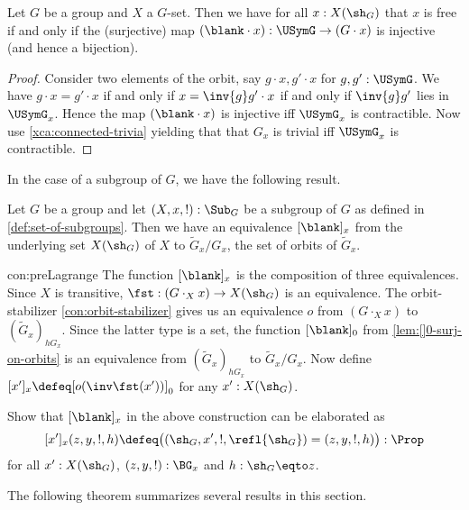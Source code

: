 \begin{lemma}\label{lem:free-pt-char}
  Let $G$ be a group and $X$ a $G$-set. Then we have for all $x:X(\sh_G)$
  that $x$ is free if and only if the (surjective) map
  $(\blank \cdot x) : \USymG \to (G\cdot x)$ is injective
  (and hence a bijection).
\end{lemma}
\begin{proof}
  Consider two elements of the orbit, say $g\cdot x,g'\cdot x$ for $g,g':\USymG$.
  We have $g\cdot x=g' \cdot x$ if and only if $x = \inv{g} g'\cdot x$
  if and only if $\inv{g} g'$ lies in $\USymG_x$.
  Hence the map $(\blank \cdot x)$ is injective iff $\USymG_x$ is contractible.
  Now use \cref{xca:connected-trivia} yielding that that 
  $G_x$ is trivial iff $\USymG_x$ is contractible.
\end{proof}

In the case of a subgroup of $G$, we have the following result.

\begin{construction}\label{con:preLagrange}
  Let $G$ be a group and let $(X,x,!):\Sub_G$ be a subgroup of $G$ as defined
  in \cref{def:set-of-subgroups}. Then we have an equivalence
  $[\blank]_x$ from the underlying set $X(\sh_G)$ of $X$ to 
  $\tilde G_x /G_x$, the set of orbits of $\tilde G_x$. 
\end{construction}
\begin{implementation}{con:preLagrange}
The function $[\blank]_x$ is the composition of three equivalences.
Since $X$ is transitive, $\fst: (G\cdot_X x)\to X(\sh_G)$ is an equivalence.
The orbit-stabilizer \cref{con:orbit-stabilizer} gives us an equivalence $o$
from $(G\cdot_X x)$ to $(\tilde G_x)_{hG_x}$. Since the latter type is a set,
the function $[\blank]_0$ from \cref{lem:[]0-surj-on-orbits} 
is an equivalence from $(\tilde G_x)_{hG_x}$ to $\tilde G_x /G_x$.
Now define $[x']_x \defeq [o(\inv\fst(x'))]_0$ for any $x':X(\sh_G)$.
\end{implementation}

\begin{xca}\label{xca:preLagrange}
Show that $[\blank]_x$ in the above construction can be elaborated as
\[
[x']_x(z,y,!,h) \defeq \bigl((\sh_G,x',!,\refl{\sh_G})=(z,y,!,h)\bigr):\Prop
\]
for all $x':X(\sh_G)$, $(z,y,!):\BG_x$ and $h:\sh_G\eqto z$.
\end{xca}

The following theorem summarizes several results in this section.

